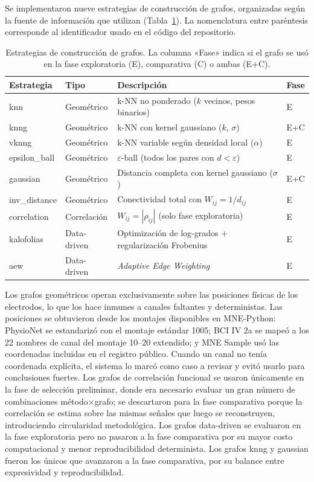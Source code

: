 Se implementaron nueve estrategias de construcción de grafos, organizadas según la fuente de información que utilizan (Tabla~\ref{tab:graph_methods}). La nomenclatura entre paréntesis corresponde al identificador usado en el código del repositorio.

\begin{table}[htbp]
\centering
\caption{Estrategias de construcción de grafos. La columna «Fase» indica si el grafo se usó en la fase exploratoria (E), comparativa (C) o ambas (E+C).}
\label{tab:graph_methods}
\small
\begin{tabular}{@{}llp{4.8cm}l@{}}
\toprule
Estrategia & Tipo & Descripción & Fase \\
\midrule
knn & Geométrico & k-NN no ponderado ($k$ vecinos, pesos binarios) & E \\
knng & Geométrico & k-NN con kernel gaussiano ($k$, $\sigma$) & E+C \\
vknng & Geométrico & k-NN variable según densidad local ($\alpha$) & E \\
epsilon\_ball & Geométrico & $\varepsilon$-ball (todos los pares con $d<\varepsilon$) & E \\
gaussian & Geométrico & Distancia completa con kernel gaussiano ($\sigma$) & E+C \\
inv\_distance & Geométrico & Conectividad total con $W_{ij}=1/d_{ij}$ & E \\
correlation & Correlación & $W_{ij}=|\rho_{ij}|$ (solo fase exploratoria) & E \\
kalofolias & Data-driven & Optimización de log-grados + regularización Frobenius & E \\
aew & Data-driven & \textit{Adaptive Edge Weighting} & E \\
\bottomrule
\end{tabular}
\end{table}

Los grafos geométricos operan exclusivamente sobre las posiciones físicas de los electrodos, lo que los hace inmunes a canales faltantes y deterministas. Las posiciones se obtuvieron desde los montajes disponibles en MNE-Python: PhysioNet se estandarizó con el montaje estándar 1005; BCI IV 2a se mapeó a los 22 nombres de canal del montaje 10--20 extendido; y MNE Sample usó las coordenadas incluidas en el registro público. Cuando un canal no tenía coordenada explícita, el sistema lo marcó como caso a revisar y evitó usarlo para conclusiones fuertes. Los grafos de correlación funcional se usaron únicamente en la fase de selección preliminar, donde era necesario evaluar un gran número de combinaciones método$\times$grafo; se descartaron para la fase comparativa porque la correlación se estima sobre las mismas señales que luego se reconstruyen, introduciendo circularidad metodológica. Los grafos data-driven se evaluaron en la fase exploratoria pero no pasaron a la fase comparativa por su mayor costo computacional y menor reproducibilidad determinista. Los grafos knng y gaussian fueron los únicos que avanzaron a la fase comparativa, por su balance entre expresividad y reproducibilidad.
